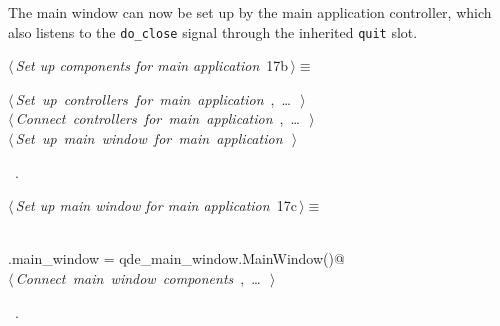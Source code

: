 \documentclass[
    a4paper,      %
    10pt,         %
    openright,    %
    notitlepage,  %
    parskip=half, %
]{scrreprt}       %
\theoremstyle{definition}                    %
\begin{document}
The main window can now be set up by the main application controller, which also
listens to the \verb=do_close= signal through the inherited \verb=quit= slot.

\begin{flushleft} \small
\begin{minipage}{\linewidth}\label{scrap8}\raggedright\small
{} $\langle\,${\itshape Set up components for main application}\nobreak\ {\footnotesize {17b}}$\,\rangle\equiv$
\vspace{-1ex}
\begin{list}{}{} \item
\mbox{}\lstinline@@\hbox{$\langle\,${\itshape Set up controllers for main application}\nobreak\ {\footnotesize {}, \ldots\ }$\,\rangle$}\lstinline@@\\
\mbox{}\lstinline@@\hbox{$\langle\,${\itshape Connect controllers for main application}\nobreak\ {\footnotesize {}, \ldots\ }$\,\rangle$}\lstinline@@\\
\mbox{}\lstinline@@\hbox{$\langle\,${\itshape Set up main window for main application}\nobreak\ {\footnotesize {}}$\,\rangle$}\lstinline@@{\NWsep}
\end{list}
\vspace{-1.5ex}
\footnotesize
\begin{list}{}{\setlength{\itemsep}{-\parsep}\setlength{\itemindent}{-\leftmargin}}
\item \NWtxtMacroRefIn\ .

\item{}
\end{list}
\end{minipage}\vspace{4ex}
\end{flushleft}
\begin{flushleft} \small
\begin{minipage}{\linewidth}\label{scrap9}\raggedright\small
{} $\langle\,${\itshape Set up main window for main application}\nobreak\ {\footnotesize {17c}}$\,\rangle\equiv$
\vspace{-1ex}
\begin{list}{}{} \item
\mbox{}\lstinline@@\\
\mbox{}\lstinline@self.main_window = qde_main_window.MainWindow()@\\
\mbox{}\lstinline@@\hbox{$\langle\,${\itshape Connect main window components}\nobreak\ {\footnotesize {}, \ldots\ }$\,\rangle$}\lstinline@@{\NWsep}
\end{list}
\vspace{-1.5ex}
\footnotesize
\begin{list}{}{\setlength{\itemsep}{-\parsep}\setlength{\itemindent}{-\leftmargin}}
\item \NWtxtMacroRefIn\ .

\item{}
\end{list}
\end{minipage}\vspace{4ex}
\end{flushleft}
\end{document}
